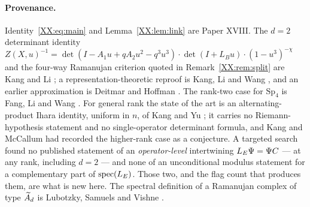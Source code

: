 \paragraph{Provenance.} Identity~\eqref{XX:eq:main} and Lemma~\ref{XX:lem:link} are Paper XVIII.
The $d=2$ determinant identity
$Z(X,u)^{-1}=\det(I-A_1u+qA_2u^{2}-q^{3}u^{3})\cdot\det(I+L_Bu)\cdot(1-u^{3})^{-\chi}$
and the four-way Ramanujan criterion quoted in Remark~\ref{XX:rem:split} are Kang and Li
\cite{KL14}; a representation-theoretic reproof is Kang, Li and Wang \cite{KLW10}, and an
earlier approximation is Deitmar and Hoffman \cite{DH06}. The rank-two case for
$\mathrm{Sp}_4$ is Fang, Li and Wang \cite{FLW13}. For general rank the state of the art is
an alternating-product Ihara identity, uniform in $n$, of Kang and Yu \cite{KY26}; it carries
no Riemann-hypothesis statement and no single-operator determinant formula, and Kang and
McCallum \cite{KM16} had recorded the higher-rank case as a conjecture. A targeted search
found no published statement of an \emph{operator-level} intertwining
$L_E\Psi=\Psi C$ --- at any rank, including $d=2$ --- and none of an unconditional modulus
statement for a complementary part of $\mathrm{spec}(L_E)$. Those two, and the flag count
that produces them, are what is new here. The spectral definition of a Ramanujan complex of
type $\widetilde A_{d}$ is Lubotzky, Samuels and Vishne \cite{LSV05}.
